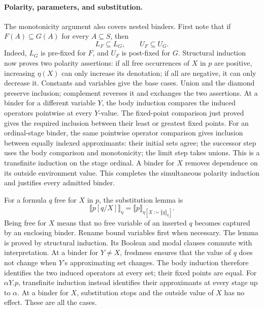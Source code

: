 \paragraph{Polarity, parameters, and substitution.}
The monotonicity argument also covers nested binders.
First note that if \(F(A)\subseteq G(A)\) for every
\(A\subseteq S\), then
\[
 L_F\subseteq L_G,\qquad U_F\subseteq U_G.
\]
Indeed, \(L_G\) is pre-fixed for \(F\), and \(U_F\)
is post-fixed for \(G\).
Structural induction now proves two polarity assertions:
if all free occurrences of \(X\) in \(p\) are positive,
increasing \(\eta(X)\) can only increase its denotation;
if all are negative, it can only decrease it.
Constants and variables give the base cases. Union and
the diamond preserve inclusion; complement reverses it
and exchanges the two assertions. At a binder for a
different variable \(Y\), the body induction compares
the induced operators pointwise at every \(Y\)-value.
The fixed-point comparison just proved gives the required
inclusion between their least or greatest fixed points.
For an ordinal-stage binder, the same pointwise
operator comparison gives inclusion between equally
indexed approximants: their initial sets agree;
the successor step uses the body comparison and
monotonicity; the limit step takes unions.
This is a transfinite induction on the stage ordinal.
A binder for \(X\) removes dependence on its outside
environment value. This completes the simultaneous
polarity induction and justifies every admitted binder.

For a formula \(q\) free for \(X\) in \(p\), the
substitution lemma is
\[
 \llbracket p[q/X]\rrbracket_\eta
   =\llbracket p\rrbracket_{
         \eta[X:=\llbracket q\rrbracket_\eta]}.
\]
Being free for \(X\) means that no free variable of an
inserted \(q\) becomes captured by an enclosing binder.
Rename bound variables first when necessary.
The lemma is proved by structural induction. Its
Boolean and modal clauses commute with interpretation.
At a binder for \(Y\ne X\), freshness ensures that
the value of \(q\) does not change when \(Y\)'s
approximating set changes. The body induction therefore
identifies the two induced operators at every set;
their fixed points are equal. For \(\alpha Y.p\),
transfinite induction instead identifies their
approximants at every stage up to \(\alpha\).
At a binder for \(X\),
substitution stops and the outside value of \(X\)
has no effect. These are all the cases.

